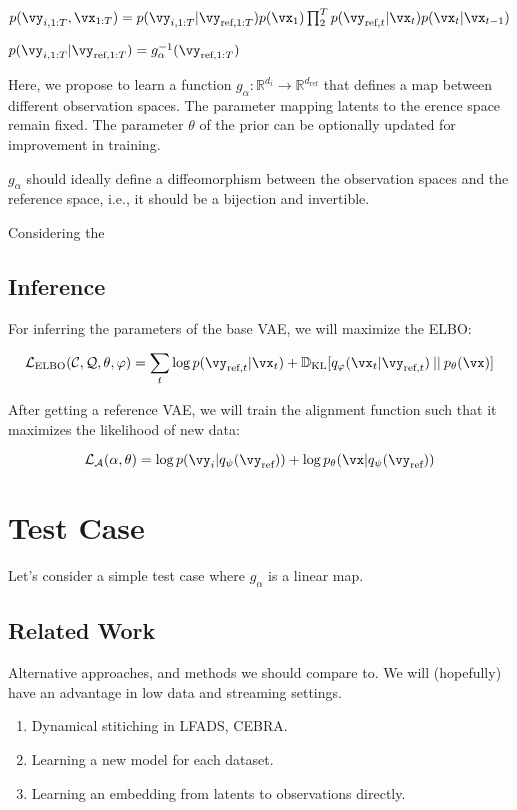 \begin{center}
    $p(\vy_{i,1:T}, \vx_{1:T}) = p(\vy_{i,1:T}|\vy_{\text{ref},1:T}) p(\vx_1) \prod_{2}^{T}p(\vy_{\text{ref},t}|\vx_t) p(\vx_t|\vx_{t-1}) $

    $p(\vy_{i,1:T}|\vy_{\text{ref},1:T}) = g_{\alpha}^{-1}(\vy_{\text{ref}, 1:T})$
\end{center}

Here, we propose to learn a function $g_{\alpha} : \mathbb{R}^{d_i} \to \mathbb{R}^{d_{\text{ref}}}$ that defines a map between different observation spaces. The parameter mapping latents to the erence space remain fixed. The parameter $\theta$ of the prior can be optionally updated for improvement in training.

$g_{\alpha}$ should ideally define a diffeomorphism between the observation spaces and the reference space, i.e., it should be a bijection and invertible. 

Considering the 


\subsection{Inference}

For inferring the parameters of the base VAE, we will maximize the ELBO:

$$\mathcal{L_{\text{ELBO}} (C, Q, \theta, \varphi)} = \sum_{t}\log p(\vy_{\text{ref}, t}|\vx_t) + \mathbb{D}_{\text{KL}}[q_{\varphi}(\vx_t|\vy_{\text{ref}, t})\: || \:p_{\theta}(\vx)]$$

After getting a reference VAE, we will train the alignment function such that it maximizes the likelihood of new data:

$$\mathcal{L_A} (\alpha, \theta) = \log p(\vy_i|q_{\psi}(\vy_{\text{ref}})) + \log p_{\theta}(\vx|q_{\psi}(\vy_{\text{ref}}))$$

\section{Test Case}

Let's consider a simple test case where $g_{\alpha}$ is a linear map. 



\subsection{Related Work}
Alternative approaches, and methods we should compare to. We will (hopefully) have an advantage in low data and streaming settings. 

\begin{enumerate}
    \item Dynamical stitiching in LFADS, CEBRA.
    \item Learning a new model for each dataset.
    \item Learning an embedding from latents to observations directly.
\end{enumerate}




